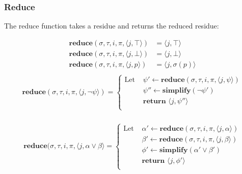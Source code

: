 \documentclass[10pt,a4paper]{article}
\newcommand{\rp}[2]{\ensuremath{\langle #1, #2 \rangle}}
\newcommand{\res}[2]{\ensuremath{r_{#1}^{#2}}}
\begin{document}
%

\subsubsection*{Reduce}
The reduce function takes a residue and returns the reduced residue:


\begin{align*}
\mathbf{reduce}(\sigma,\tau, i,\pi,\rp{j}{\top}) &= \rp{j}{\top} \\
\mathbf{reduce}(\sigma,\tau, i,\pi,\rp{j}{\bot}) &= \rp{j}{\bot} \\
\mathbf{reduce}(\sigma,\tau, i,\pi,\rp{j}{p}) &= \rp{j}{\sigma(p)} \\
\end{align*}
\begin{align*}
\mathbf{reduce}(\sigma,\tau, i,\pi,\rp{j}{\neg \psi}) = \left\{
\begin{aligned}
\text{Let } &\psi' \leftarrow \mathbf{reduce}(\sigma, \tau, i, \pi, \rp{j}{\psi}) \\
&\psi'' \leftarrow \mathbf{simplify}(\neg \psi') \\
&\textbf{return } \rp{j}{\psi''} \\
\end{aligned} \right. \\
\end{align*}

\begin{align*}
\mathbf{reduce}(\sigma,\tau, i,\pi,\rp{j}{\alpha \vee \beta} = \left\{
\begin{aligned}
\text{Let } &\alpha' \leftarrow \mathbf{reduce}(\sigma, \tau, i, \pi, \rp{j}{\alpha}) \\
&\beta' \leftarrow \mathbf{reduce}(\sigma, \tau, i, \pi, \rp{j}{\beta}) \\
&\phi' \leftarrow \mathbf{simplify}(\alpha' \vee \beta') \\
&\textbf{return } \rp{j}{\phi'} \\
\end{aligned} \right. \\
\end{align*}
\end{document}
